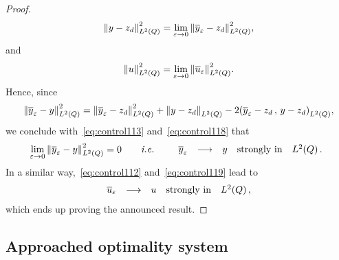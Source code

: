 \begin{proof}
\begin{equation}
        {\left\|{y -z_{d} }\right\|}_{L^{2}\left({Q}\right)}^{2} = \lim_{\varepsilon\to 0}{\left\|{{\overline{y}}_{\varepsilon} - z_{d} }\right\|}_{L^{2}\left({Q}\right)}^{2},
    \end{equation}
    and
    \begin{equation}\label{eq:control119}
        {\left\|{u }\right\|}_{L^{2}\left({Q}\right)}^{2} = \lim_{\varepsilon\to 0}{\left\|{{\overline{u}}_{\varepsilon} }\right\|}_{L^{2}\left({Q}\right)}^{2}.
    \end{equation}
    Hence, since
    \begin{equation*}
        \normecq{\bareps{y} - y} = \normecq{\bareps{y} - z_{d}} + \normeq{y
        - z_{d}} -2\scalaireq{%
            \bareps{y} - z_{d}
        }{%
            y - z_{d}
        },
    \end{equation*}
    we conclude with~\eqref{eq:control113} and~\eqref{eq:control118} that
    \begin{equation*}\label{eq:control120}
        \lim_{\varepsilon\to 0}{\left\|{{\overline{y}}_{\varepsilon} - y }\right\|}_{L^{2}\left({Q}\right)}^{2} = 0\qquad\textit{i.e.}\qquad
        \begin{array}{rclll}
            {\overline{y}}_{\varepsilon} & \longrightarrow & y & \text{strongly in} &
            L^{2}\!\left({Q}\right).
        \end{array}
    \end{equation*}
    In a similar way,~\eqref{eq:control112} and~\eqref{eq:control119} lead
    to
    \begin{equation*}
        \begin{array}{rclll}
            {\overline{u}}_{\varepsilon} & \longrightarrow & u & \text{strongly in} &
            L^{2}\!\left({Q}\right),
        \end{array}
    \end{equation*}
    which ends up proving the announced result.
\end{proof}

\subsection{Approached optimality system}\label{sec:approachedso}

